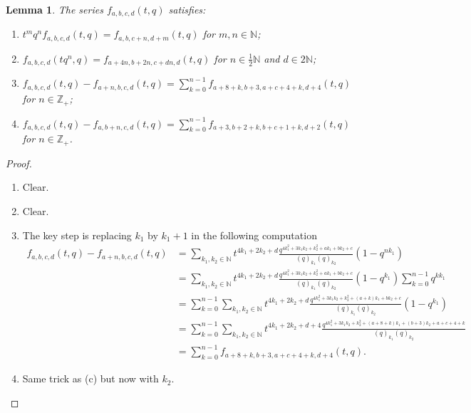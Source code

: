 \documentclass[a4paper, 12pt, reqno]{amsart}
\newtheorem{lemma}[theorem]{Lemma}
\theoremstyle{remark}
\numberwithin{equation}{subsection}
\begin{document}
\begin{lemma}
  \label{lmm:21}
  The series $f_{a, b, c, d}(t, q)$ satisfies:
  \begin{enumerate}
  \item $t^mq^nf_{a, b, c, d}(t, q) = f_{a, b, c + n, d + m}(t, q)$ for $m, n \in \mathbb{N}$;
  \item $f_{a, b, c, d}(tq^n, q) = f_{a + 4n, b + 2n, c + dn, d}(t, q)$ for $n \in \frac{1}{2}\mathbb{N}$ and $ d \in 2\mathbb{N}$;
  \item $f_{a, b, c, d}(t, q) - f_{a + n, b, c, d}(t, q) = \sum_{k = 0}^{n - 1}f_{a + 8 + k, b + 3, a + c + 4 + k, d + 4}(t, q)$ for $n \in \mathbb{Z}_+$;
  \item $f_{a, b, c, d}(t, q) - f_{a, b + n, c, d}(t, q) = \sum_{k = 0}^{n - 1}f_{a + 3, b + 2 + k, b + c + 1 + k, d + 2}(t, q)$ for $n \in \mathbb{Z}_+$.
  \end{enumerate}
\end{lemma}

\begin{proof}\leavevmode
  \begin{enumerate}
  \item Clear.
  \item Clear.
  \item The key step is replacing $k_1$ by $k_1 + 1$ in the following computation
    \begin{align*}
      f_{a, b, c, d}(t, q) - f_{a + n, b, c, d}(t, q) &= \sum_{k_1, k_2 \in \mathbb{N}}t^{4k_1 + 2k_2 + d}\frac{q^{4k_1^2 + 3k_1k_2 + k_2^2 + ak_1 + bk_2 + c}}{(q)_{k_1}(q)_{k_2}}(1 - q^{nk_1}) \\
      &= \sum_{k_1, k_2 \in \mathbb{N}}t^{4k_1 + 2k_2 + d}\frac{q^{4k_1^2 + 3k_1k_2 + k_2^2 + ak_1 + bk_2 + c}}{(q)_{k_1}(q)_{k_2}}(1 - q^{k_1})\sum_{k = 0}^{n - 1}q^{kk_1} \\
      &= \sum_{k = 0}^{n - 1}\sum_{k_1, k_2 \in \mathbb{N}}t^{4k_1 + 2k_2 + d}\frac{q^{4k_1^2 + 3k_1k_2 + k_2^2 + (a + k)k_1 + bk_2 + c}}{(q)_{k_1}(q)_{k_2}}(1 - q^{k_1}) \\
      &= \sum_{k = 0}^{n - 1}\sum_{k_1, k_2 \in \mathbb{N}}t^{4k_1 + 2k_2 + d + 4}\frac{q^{4k_1^2 + 3k_1k_2 + k_2^2 + (a + 8 + k)k_1 + (b + 3)k_2 + a + c + 4 + k}}{(q)_{k_1}(q)_{k_2}} \\
      &= \sum_{k = 0}^{n - 1}f_{a + 8 + k, b + 3, a + c + 4 + k, d + 4}(t, q).
    \end{align*}
  \item Same trick as (c) but now with $k_2$. \qedhere
  \end{enumerate}
\end{proof}
\end{document}
